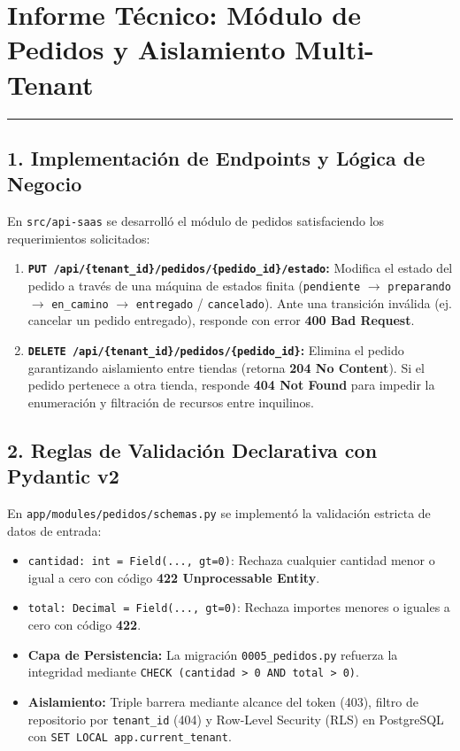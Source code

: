 \documentclass[11pt,a4paper]{article}
\begin{document}

\section*{Informe Técnico: Módulo de Pedidos y Aislamiento Multi-Tenant}
\vspace{0.2cm}
\hrule
\vspace{0.4cm}

\subsection*{1. Implementación de Endpoints y Lógica de Negocio}
En \texttt{src/api-saas} se desarrolló el módulo de pedidos satisfaciendo los requerimientos solicitados:
\begin{enumerate}
    \item \textbf{\texttt{PUT /api/\{tenant\_id\}/pedidos/\{pedido\_id\}/estado}:} Modifica el estado del pedido a través de una máquina de estados finita (\texttt{pendiente} $\rightarrow$ \texttt{preparando} $\rightarrow$ \texttt{en\_camino} $\rightarrow$ \texttt{entregado} / \texttt{cancelado}). Ante una transición inválida (ej. cancelar un pedido entregado), responde con error \textbf{400 Bad Request}.
    \item \textbf{\texttt{DELETE /api/\{tenant\_id\}/pedidos/\{pedido\_id\}}:} Elimina el pedido garantizando aislamiento entre tiendas (retorna \textbf{204 No Content}). Si el pedido pertenece a otra tienda, responde \textbf{404 Not Found} para impedir la enumeración y filtración de recursos entre inquilinos.
\end{enumerate}

\subsection*{2. Reglas de Validación Declarativa con Pydantic v2}
En \texttt{app/modules/pedidos/schemas.py} se implementó la validación estricta de datos de entrada:
\begin{itemize}
    \item \texttt{cantidad: int = Field(..., gt=0)}: Rechaza cualquier cantidad menor o igual a cero con código \textbf{422 Unprocessable Entity}.
    \item \texttt{total: Decimal = Field(..., gt=0)}: Rechaza importes menores o iguales a cero con código \textbf{422}.
    \item \textbf{Capa de Persistencia:} La migración \texttt{0005\_pedidos.py} refuerza la integridad mediante \texttt{CHECK (cantidad > 0 AND total > 0)}.
    \item \textbf{Aislamiento:} Triple barrera mediante alcance del token (403), filtro de repositorio por \texttt{tenant\_id} (404) y Row-Level Security (RLS) en PostgreSQL con \texttt{SET LOCAL app.current\_tenant}.
\end{itemize}
\end{document}
